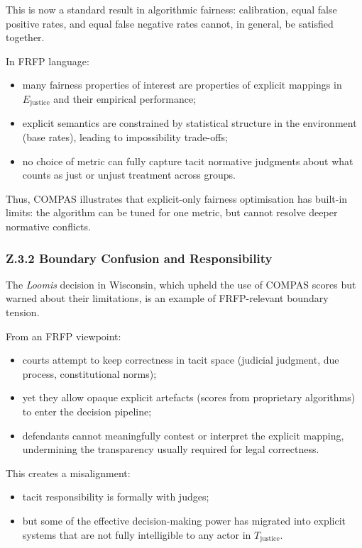 This is now a standard result in algorithmic fairness:
calibration, equal false positive rates, and equal false negative rates
cannot, in general, be satisfied together.

In FRFP language:

\begin{itemize}
  \item many fairness properties of interest are properties of explicit
        mappings in \(E_{\mathrm{justice}}\) and their empirical performance;
  \item explicit semantics are constrained by statistical structure in the
        environment (base rates), leading to impossibility trade-offs;
  \item no choice of metric can fully capture tacit normative judgments about
        what counts as just or unjust treatment across groups.
\end{itemize}

Thus, COMPAS illustrates that explicit-only fairness optimisation has
built-in limits: the algorithm can be tuned for one metric, but cannot
resolve deeper normative conflicts.

\subsubsection*{Z.3.2 Boundary Confusion and Responsibility}

The \emph{Loomis} decision in Wisconsin, which upheld the use of COMPAS
scores but warned about their limitations, is an example of FRFP-relevant
boundary tension.

From an FRFP viewpoint:

\begin{itemize}
  \item courts attempt to keep correctness in tacit space
        (judicial judgment, due process, constitutional norms);
  \item yet they allow opaque explicit artefacts (scores from proprietary
        algorithms) to enter the decision pipeline;
  \item defendants cannot meaningfully contest or interpret the explicit
        mapping, undermining the transparency usually required for legal
        correctness.
\end{itemize}

This creates a misalignment:

\begin{itemize}
  \item tacit responsibility is formally with judges;
  \item but some of the effective decision-making power has migrated into
        explicit systems that are not fully intelligible to any actor in
        \(T_{\mathrm{justice}}\).
\end{itemize}

